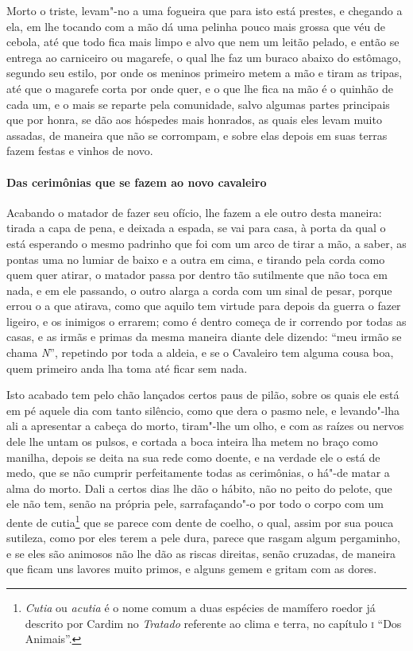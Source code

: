 \begin{linenumbers}
 Morto o triste, levam"-no a uma fogueira que para isto está prestes, e
chegando a ela, em lhe tocando com a mão dá uma pelinha pouco mais
grossa que véu de cebola, até que todo fica mais limpo e alvo que nem
um leitão pelado, e então se entrega ao carniceiro ou magarefe, o qual
lhe faz um buraco abaixo do estômago, segundo seu estilo, por onde os
meninos primeiro metem a mão e tiram as tripas, até que o magarefe
corta por onde quer, e o que lhe fica na mão é o quinhão de cada um, e
o mais se reparte pela comunidade, salvo algumas partes principais que
por honra, se dão aos hóspedes mais honrados, as quais eles levam muito
assadas, de maneira que não se corrompam, e sobre elas depois em suas
terras fazem festas e vinhos de novo. 

\paragraph{Das cerimônias que se fazem ao novo cavaleiro} \quad
Acabando o matador de fazer seu ofício, lhe fazem a ele outro
desta maneira: tirada a capa de pena, e deixada a espada, se vai para
casa, à porta da qual o está esperando o mesmo padrinho que foi com um
arco de tirar a mão, a saber, as pontas uma no lumiar de baixo e a
outra em cima, e tirando pela corda como quem quer atirar, o matador
passa por dentro tão sutilmente que não toca em nada, e em ele
passando, o outro alarga a corda com um sinal de pesar, porque errou o
a que atirava, como que aquilo tem virtude para depois da guerra o
fazer ligeiro, e os inimigos o errarem; como é dentro começa de ir
correndo por todas as casas, e as irmãs e primas da mesma maneira
diante dele dizendo: ``meu irmão se chama \textit{N}'', repetindo por
toda a aldeia, e se o Cavaleiro tem alguma cousa boa, quem primeiro
anda lha toma até ficar sem nada. 

 Isto acabado tem pelo chão lançados certos paus de pilão, sobre os
quais ele está em pé aquele dia com tanto silêncio, como que dera o
pasmo nele, e levando"-lha ali a apresentar a cabeça do morto, tiram"-lhe
um olho, e com as raízes ou nervos dele lhe untam os pulsos, e cortada
a boca inteira lha metem no braço como manilha, depois se deita na sua
rede como doente, e na verdade ele o está de medo, que se não cumprir
perfeitamente todas as cerimônias, o há"-de matar a alma do morto. Dali
a certos dias lhe dão o hábito, não no peito do pelote, que ele não
tem, senão na própria pele, sarrafaçando"-o por todo o corpo com um
dente de cutia\footnote{ \textit{Cutia} ou \textit{acutia} é o nome
comum a duas espécies de mamífero roedor já descrito por Cardim no
\textit{Tratado} referente ao clima e terra, no capítulo \textsc{i} ``Dos
Animais''.} que se parece com dente de coelho, o qual, assim por sua
pouca sutileza, como por eles terem a pele dura, parece que rasgam
algum pergaminho, e se eles são animosos não lhe dão as riscas
direitas, senão cruzadas, de maneira que ficam uns lavores muito
primos, e alguns gemem e gritam com as dores.


\end{linenumbers}
